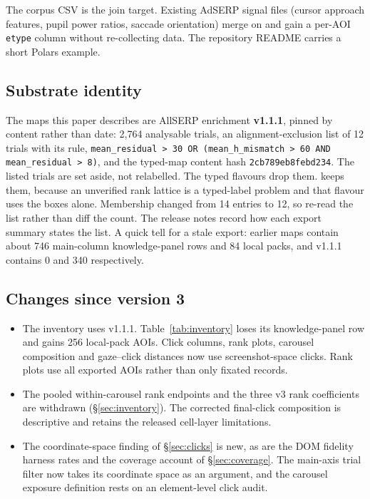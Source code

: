 \documentclass[sigconf,authorversion,natbib=true]{acmart}
\begin{document}
The corpus CSV is the join target. Existing AdSERP signal files (cursor approach features, pupil power ratios, saccade orientation) merge on  and gain a per-AOI \texttt{etype} column without re-collecting data. The repository README carries a short Polars example.

\subsection{Substrate identity}

The maps this paper describes are AllSERP enrichment \textbf{v1.1.1}, pinned by content rather than date: 2,764 analysable trials, an alignment-exclusion list of 12 trials with its rule, \texttt{mean\_residual > 30 OR (mean\_h\_mismatch > 60 AND mean\_residual > 8)}, and the typed-map content hash \texttt{2cb789eb8febd234}. The listed trials are set aside, not relabelled. The typed flavours drop them.  keeps them, because an unverified rank lattice is a typed-label problem and that flavour uses the boxes alone. Membership changed from 14 entries to 12, so re-read the list rather than diff the count. The release notes record how each export summary states the list. A quick tell for a stale export: earlier maps contain about 746 main-column knowledge-panel rows and 84 local packs, and v1.1.1 contains 0 and 340 respectively.

\subsection{Changes since version 3}

\begin{itemize}
  \item The inventory uses v1.1.1. Table~\ref{tab:inventory} loses its knowledge-panel row and gains 256 local-pack AOIs. Click columns, rank plots, carousel composition and gaze--click distances now use screenshot-space clicks. Rank plots use all exported AOIs rather than only fixated records.
  \item The pooled within-carousel rank endpoints and the three v3 rank coefficients are withdrawn (\S\ref{sec:inventory}). The corrected final-click composition is descriptive and retains the released cell-layer limitations.
  \item The coordinate-space finding of \S\ref{sec:clicks} is new, as are the DOM fidelity harness rates and the coverage account of \S\ref{sec:coverage}. The main-axis trial filter now takes its coordinate space as an argument, and the carousel exposure definition rests on an element-level click audit.
\end{itemize}
\end{document}
